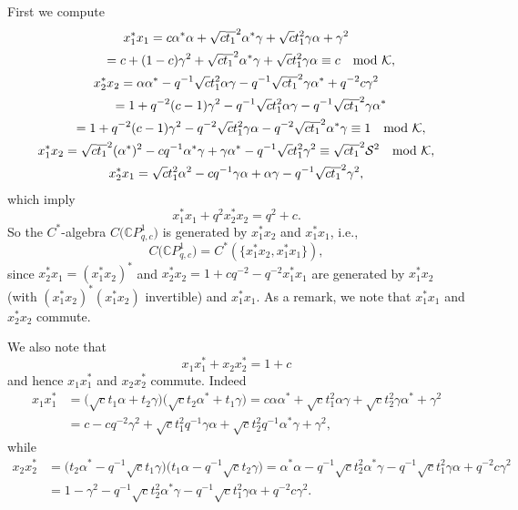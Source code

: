 First we compute
\begin{gather*}
x_{1}^{\ast}x_{1} =c\alpha^{\ast}\alpha+\sqrt{c}\overline{t_{1}}^{2}%
\alpha^{\ast}\gamma+\sqrt{c}t_{1}^{2}\gamma\alpha+\gamma^{2}\\
\hphantom{x_{1}^{\ast}x_{1}}{} =c+(1-c) \gamma^{2}+\sqrt{c}\overline{t_{1}}^{2}\alpha^{\ast
}\gamma+\sqrt{c}t_{1}^{2}\gamma\alpha\equiv c\quad \text{mod\ }\mathcal{K},
\\
x_{2}^{\ast}x_{2} =\alpha\alpha^{\ast}-q^{-1}\sqrt{c}t_{1}^{2}\alpha
\gamma-q^{-1}\sqrt{c}\overline{t_{1}}^{2}\gamma\alpha^{\ast}+q^{-2}c\gamma
^{2}\\
\hphantom{x_{2}^{\ast}x_{2}}{} =1+q^{-2}(c-1) \gamma^{2}-q^{-1}\sqrt{c}t_{1}^{2}\alpha
\gamma-q^{-1}\sqrt{c}\overline{t_{1}}^{2}\gamma\alpha^{\ast}\\
\hphantom{x_{2}^{\ast}x_{2}}{} =1+q^{-2}(c-1) \gamma^{2}-q^{-2}\sqrt{c}t_{1}^{2}\gamma
\alpha-q^{-2}\sqrt{c}\overline{t_{1}}^{2}\alpha^{\ast}\gamma\equiv
1\quad \text{mod\ }\mathcal{K},
\\
x_{1}^{\ast}x_{2}=\sqrt{c}\overline{t_{1}}^{2} ( \alpha^{\ast} )
^{2}-cq^{-1}\alpha^{\ast}\gamma+\gamma\alpha^{\ast}-q^{-1}\sqrt{c}t_{1}%
^{2}\gamma^{2}\equiv\sqrt{c}\overline{t_{1}}^{2}\mathcal{S}^{2} \quad \text{mod\ }
\mathcal{K},
\\
x_{2}^{\ast}x_{1}=\sqrt{c}t_{1}^{2}\alpha^{2}-cq^{-1}\gamma\alpha+\alpha
\gamma-q^{-1}\sqrt{c}\overline{t_{1}}^{2}\gamma^{2},
\end{gather*}
which imply
\[
x_{1}^{\ast}x_{1}+q^{2}x_{2}^{\ast}x_{2}=q^{2}+c.
\]
So the $C^*$-algebra $C\big( \mathbb{C}P_{q,c}^{1}\big) $ is generated by
$x_{1}^{\ast}x_{2}$ and $x_{1}^{\ast}x_{1}$, i.e.,
\[
C \big( \mathbb{C}P_{q,c}^{1} \big) =C^{\ast} ( \{ x_{1}^{\ast
}x_{2}, x_{1}^{\ast}x_{1} \} ) ,
\]
since $x_{2}^{\ast}x_{1}= ( x_{1}^{\ast}x_{2} ) ^{\ast}$ and
$x_{2}^{\ast}x_{2}=1+cq^{-2}-q^{-2}x_{1}^{\ast}x_{1}$ are generated by
$x_{1}^{\ast}x_{2}$ (with $ ( x_{1}^{\ast}x_{2} ) ^{\ast} (
x_{1}^{\ast}x_{2} ) $ invertible) and $x_{1}^{\ast}x_{1}$. As a remark,
we note that $x_{1}^{\ast}x_{1}$ and $x_{2}^{\ast}x_{2}$ commute.

We also note that
\[
x_{1}x_{1}^{\ast}+x_{2}x_{2}^{\ast}=1+c
\]
and hence $x_{1}x_{1}^{\ast}$ and $x_{2}x_{2}^{\ast}$ commute. Indeed
\begin{align*}
x_{1}x_{1}^{\ast} & =\big( \sqrt{c}t_{1}\alpha+t_{2}\gamma\big) \big(
\sqrt{c}t_{2}\alpha^{\ast}+t_{1}\gamma\big) =c\alpha\alpha^{\ast}+\sqrt
{c}t_{1}^{2}\alpha\gamma+\sqrt{c}t_{2}^{2}\gamma\alpha^{\ast}+\gamma^{2}\\
& =c-cq^{-2}\gamma^{2}+\sqrt{c}t_{1}^{2}q^{-1}\gamma\alpha+\sqrt{c}t_{2}
^{2}q^{-1}\alpha^{\ast}\gamma+\gamma^{2},
\end{align*}
while
\begin{align*}
x_{2}x_{2}^{\ast} & =\big( t_{2}\alpha^{\ast}-q^{-1}\sqrt{c}t_{1}
\gamma\big) \big( t_{1}\alpha-q^{-1}\sqrt{c}t_{2}\gamma\big)
=\alpha^{\ast}\alpha-q^{-1}\sqrt{c}t_{2}^{2}\alpha^{\ast}\gamma-q^{-1}\sqrt
{c}t_{1}^{2}\gamma\alpha+q^{-2}c\gamma^{2}\\
& =1-\gamma^{2}-q^{-1}\sqrt{c}t_{2}^{2}\alpha^{\ast}\gamma-q^{-1}\sqrt
{c}t_{1}^{2}\gamma\alpha+q^{-2}c\gamma^{2}.
\end{align*}

